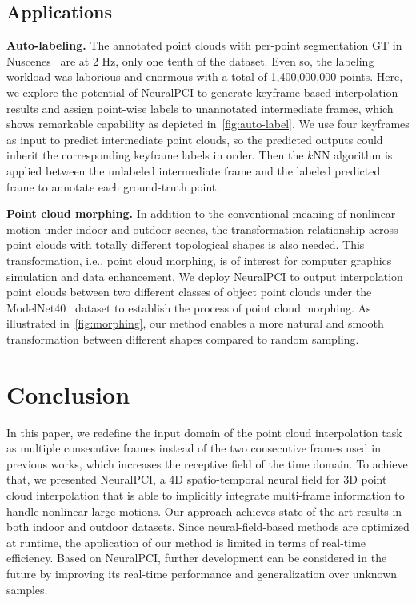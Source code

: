 \documentclass[10pt,twocolumn,letterpaper]{article}
\begin{document}
\subsection{Applications}

\textbf{Auto-labeling. }The annotated point clouds with per-point segmentation GT in Nuscenes~\cite{caesar2020nuscenes} are at 2 Hz, only one tenth of the dataset. Even so, the labeling workload was laborious and enormous with a total of 1,400,000,000 points. Here, we explore the potential of NeuralPCI to generate keyframe-based interpolation results and assign point-wise labels to unannotated intermediate frames, which shows remarkable capability as depicted in~\cref{fig:auto-label}. We use four keyframes as input to predict intermediate point clouds, so the predicted outputs could inherit the corresponding keyframe labels in order. Then the $\mathit{k}$NN algorithm is applied between the unlabeled intermediate frame and the labeled predicted frame to annotate each ground-truth point.



\textbf{Point cloud morphing.} In addition to the conventional meaning of nonlinear motion under indoor and outdoor scenes, the transformation relationship across point clouds with totally different topological shapes is also needed. This transformation, i.e., point cloud morphing, is of interest for computer graphics simulation and data enhancement. We deploy NeuralPCI to output interpolation point clouds between two different classes of object point clouds under the ModelNet40~\cite{wu20153d} dataset to establish the process of point cloud morphing. As illustrated in~\cref{fig:morphing}, our method enables a more natural and smooth transformation between different shapes compared to random sampling.



\section{Conclusion}
\label{sec: conclusion}

In this paper, we redefine the input domain of the point cloud interpolation task as multiple consecutive frames instead of the two consecutive frames used in previous works, which increases the receptive field of the time domain. To achieve that, we presented NeuralPCI, a 4D spatio-temporal neural field for 3D point cloud interpolation that is able to implicitly integrate multi-frame information to handle nonlinear large motions. Our approach achieves state-of-the-art results in both indoor and outdoor datasets. Since neural-field-based methods are optimized at runtime, the application of our method is limited in terms of real-time efficiency. Based on NeuralPCI, further development can be considered in the future by improving its real-time performance and generalization over unknown samples. 
\end{document}

